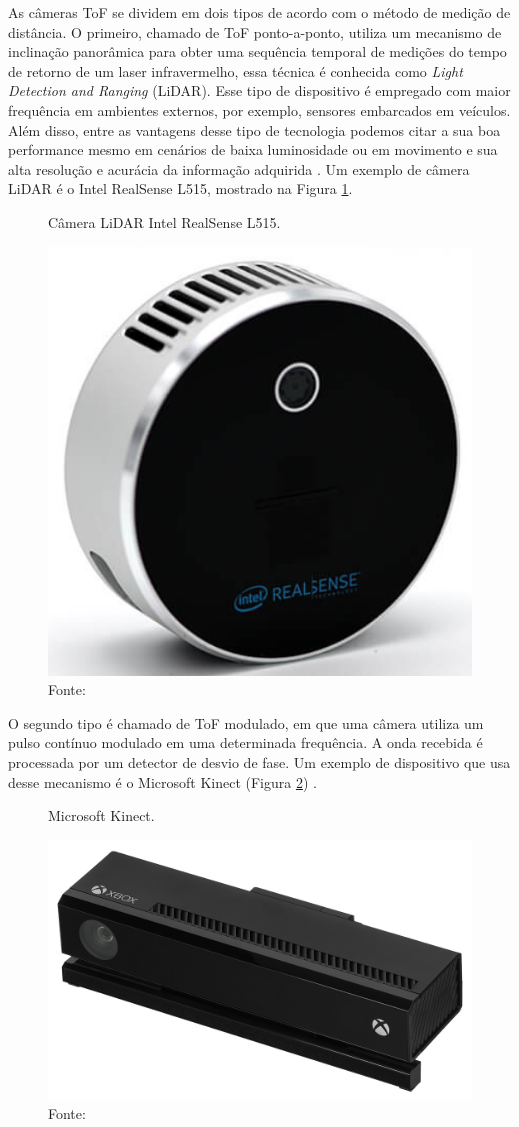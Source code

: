  As câmeras ToF se dividem em dois tipos de acordo com o método de medição de distância. O primeiro, chamado de ToF ponto-a-ponto, utiliza um mecanismo de inclinação panorâmica para obter uma sequência temporal de medições do tempo de retorno de um laser infravermelho, essa técnica é conhecida como \textit{Light Detection and Ranging} (LiDAR). Esse tipo de dispositivo é empregado com maior frequência em ambientes externos, por exemplo, sensores embarcados em veículos. Além disso, entre as vantagens desse tipo de tecnologia podemos citar a sua boa performance mesmo em cenários de baixa luminosidade ou em movimento e sua alta resolução e acurácia da informação adquirida \cite{zollhofer2019commodity}. Um exemplo de câmera LiDAR é o Intel RealSense L515, mostrado na Figura \ref{fig:lidar}.

 \begin{figure}[h]
    \centering
    \caption{Câmera LiDAR Intel RealSense L515.}
    \includegraphics[width=.4\textwidth]{fig/lidar_cams.png}
    \caption*{Fonte: }
    \label{fig:lidar}
\end{figure}

O segundo tipo é chamado de ToF modulado, em que uma câmera utiliza um pulso contínuo modulado em uma determinada frequência. A onda recebida é processada por um detector de desvio de fase. Um exemplo de dispositivo que usa desse mecanismo é o Microsoft Kinect (Figura \ref{fig:kinect}) \cite{zollhofer2019commodity}.

\begin{figure}[h]
    \centering
    \caption{Microsoft Kinect.}
    \includegraphics[width=.6\textwidth]{fig/kinect.jpg}
    \caption*{Fonte: }
    \label{fig:kinect}
\end{figure}

